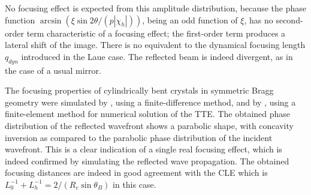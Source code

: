 \documentclass[preprint]{iucr}              %
\begin{document}
No focusing effect is expected from this amplitude distribution, because the phase function $\arcsin(\xi \sin2\theta/ (p |\chi_h|))$, being an odd function of $\xi$, has no second-order term characteristic of a focusing effect; the first-order term produces a lateral shift of the image. There is no equivalent to the dynamical focusing length $q_{dyn}$ introduced in the Laue case. The reflected beam is indeed divergent, as in the case of a usual mirror.

The focusing properties of cylindrically bent crystals in symmetric Bragg geometry were simulated by \cite{sutter2010}, using a finite-difference method, and by \cite{honkanen2017, Honkanen2018}, using a finite-element method for numerical solution of the TTE. The obtained phase distribution of the reflected wavefront shows a parabolic shape, with concavity inversion as compared to the parabolic phase distribution of the incident wavefront. This is a clear indication of a single real focusing effect, which is indeed confirmed by simulating the reflected wave propagation. The obtained focusing distances are indeed in good agreement with the CLE which is $L_0^{-1}+L_h^{-1}=2/(R_c \sin\theta_B)$ in this case.









\end{document}
